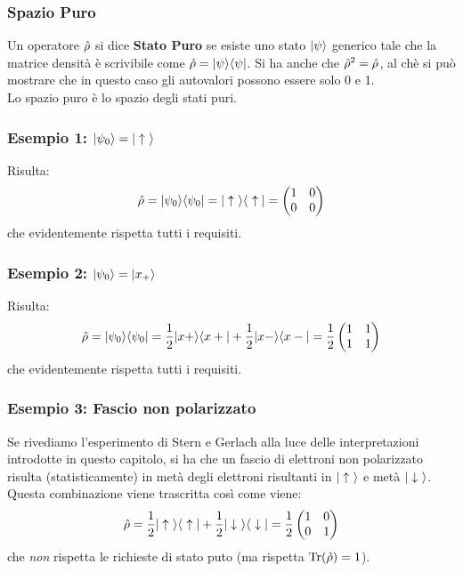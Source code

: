 \subsubsection*{Spazio Puro}
Un operatore $\hr$ si dice \textbf{Stato Puro} se esiste uno stato $\Ket \psi$ generico tale che la matrice densità è scrivibile come $\hat \rho = \ketbra \psi \psi$. Si ha anche che $\hr^2 = \hr$, al chè si può mostrare che in questo caso gli autovalori possono essere solo 0 e 1.\\
Lo spazio puro è lo spazio degli stati puri.

\subsubsection*{Esempio 1: $\Ket {\psi_0} = \Up$}
Risulta:
\[
    \hr = \ketbrabra{\psi_0} = \Up \Pu = \begin{pmatrix}
        1 & 0 \\
        0 & 0 \\
    \end{pmatrix}
\]
che evidentemente rispetta tutti i requisiti.

\subsubsection*{Esempio 2: $\Ket {\psi_0} = \Ket {x_+}$}
Risulta:
\[
    \hat \rho = \ketbrabra{\psi_0} = \half \ketbra {x+} {x+} + \half \ketbra {x-} {x-} = \half \begin{pmatrix}
        1 & 1 \\
        1 & 1 \\
    \end{pmatrix}
\]
che evidentemente rispetta tutti i requisiti.

\subsubsection*{Esempio 3: Fascio non polarizzato}
Se rivediamo l'esperimento di Stern e Gerlach alla luce delle interpretazioni introdotte in questo capitolo, si ha che un fascio di elettroni non polarizzato risulta (statisticamente) in metà degli elettroni risultanti in $\Up$ e metà $\Dn$. Questa combinazione viene trascritta così come viene:
\[
    \hat \rho = \half \Up \Pu + \half \Dn \Nd = \half \begin{pmatrix}
        1 & 0 \\
        0 & 1 \\
    \end{pmatrix}
\]
che \textit{non} rispetta le richieste di stato puto (ma rispetta $\Tr(\hr) = 1$).

